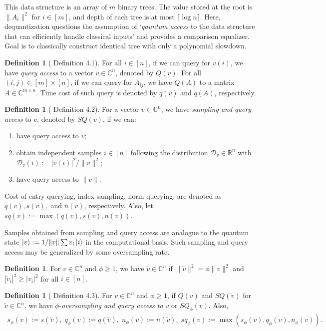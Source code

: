 \documentclass[10pt,twoside,reqno]{amsart} %
\theoremstyle{plain}
\theoremstyle{definition}
\newtheorem{defn}[thm]{Definition}
\begin{document}
This data structure is an array of $m$  binary trees. The value
stored at the root is $\|A_i\|^2$ for $i\in[m]$, and depth of each tree is
at most $\lceil\log n\rceil$. Here, dequantization questions the assumption
of `\emph{qauntum access} to the data structure that can efficiently handle
classical inputs' and provides a comparison equalizer. Goal is to classically
construct identical tree with only a polynomial slowdown. 
\begin{defn}[\cite{tang2023} Definition 4.1]
  For all $i\in[n]$, if we can query for $v(i)$, we have \emph{query access}
  to a vector $v\in\mathbb{C}^n$, denoted by $Q(v)$. For all 
  $(i,j)\in[m]\times[n]$, if we can query for $A_{ij}$, we have $Q(A)$ to
  a matrix $A\in\mathbb{C}^{m\times n}$. Time cost of such query is denoted
  by $q(v)$ and $q(A)$, respectively.
\end{defn}
\begin{defn}[\cite{tang2023} Definition 4.2]
  For a vector $v\in\mathbb{C}^n$, we have \emph{sampling and query access} to
  $v$, denoted by $SQ(v)$, if we can:
  \begin{enumerate}
    \item have query access to $v$;
    \item obtain independent samples $i\in[n]$ following the distribution
      $\mathcal{D}_v\in\mathbb{R}^n$ with $\mathcal{D}_v(i):=|v(i)|^2/\|v\|^2$;
    \item have query access to $\|v\|$.
  \end{enumerate}
  Cost of entry querying, index sampling, norm querying, are denoted as
  $q(v),s(v),$ and $n(v)$, respectively. Also, let $sq(v):=\max(q(v),s(v),n(v))$.
\end{defn}
Samples obtained from sampling and query access are analogue to the quantum
state $\ket{v} := 1/\|v\|\sum v_i\ket{i}$ in the computational basis. Such
sampling and query access may be generalized by some oversampling rate.
\begin{defn}
  For $v\in\mathbb{C}^n$ and $\phi\geq1$, we have
  $\widetilde{v}\in\mathbb{C}^n$ if $\|\widetilde{v}\|^2=\phi\|v\|^2$ and
  $|\widetilde{v}_i|^2\geq |v_i|^2$ for all $i\in[n]$.
\end{defn}
\begin{defn}[\cite{tang2023} Definition 4.3]
  For $v\in\mathbb{C}^n$ and $\phi\geq1$, if $Q(v)$ and 
  $SQ(\widetilde{v})$ for $\widetilde{v}\in\mathbb{C}^n$, we have 
  $\phi$-\emph{oversampling and query access to $v$} or $SQ_{\phi}(v)$. Also,
  \begin{align*}
    s_{\phi}(v) := s(\widetilde{v}),\;
    q_{\phi}(v) := q(\widetilde{v}),\;
    n_{\phi}(v) := n(\widetilde{v}),\;
    sq_{\phi}(v) := \max(s_{\phi}(v),q_{\phi}(v),n_{\phi}(v)).
  \end{align*}
\end{defn}
\end{document}
